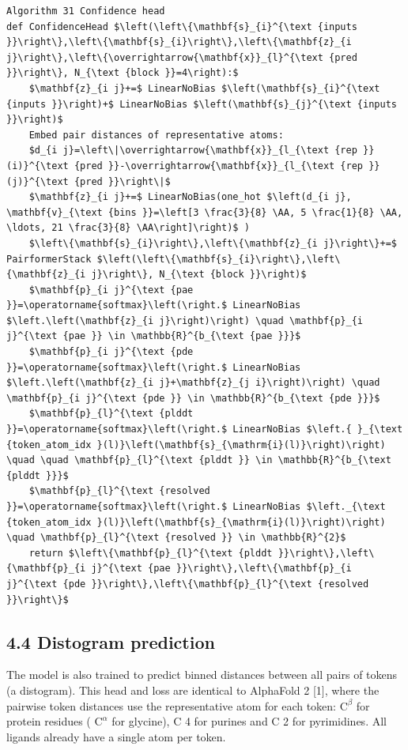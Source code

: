 \documentclass[10pt]{article}
\def\AA{\mathring{\mathrm{A}}}
\begin{document}
\begin{verbatim}
Algorithm 31 Confidence head
def ConfidenceHead $\left(\left\{\mathbf{s}_{i}^{\text {inputs }}\right\},\left\{\mathbf{s}_{i}\right\},\left\{\mathbf{z}_{i j}\right\},\left\{\overrightarrow{\mathbf{x}}_{l}^{\text {pred }}\right\}, N_{\text {block }}=4\right):$
    $\mathbf{z}_{i j}+=$ LinearNoBias $\left(\mathbf{s}_{i}^{\text {inputs }}\right)+$ LinearNoBias $\left(\mathbf{s}_{j}^{\text {inputs }}\right)$
    Embed pair distances of representative atoms:
    $d_{i j}=\left\|\overrightarrow{\mathbf{x}}_{l_{\text {rep }}(i)}^{\text {pred }}-\overrightarrow{\mathbf{x}}_{l_{\text {rep }}(j)}^{\text {pred }}\right\|$
    $\mathbf{z}_{i j}+=$ LinearNoBias(one_hot $\left(d_{i j}, \mathbf{v}_{\text {bins }}=\left[3 \frac{3}{8} \AA, 5 \frac{1}{8} \AA, \ldots, 21 \frac{3}{8} \AA\right]\right)$ )
    $\left\{\mathbf{s}_{i}\right\},\left\{\mathbf{z}_{i j}\right\}+=$ PairformerStack $\left(\left\{\mathbf{s}_{i}\right\},\left\{\mathbf{z}_{i j}\right\}, N_{\text {block }}\right)$
    $\mathbf{p}_{i j}^{\text {pae }}=\operatorname{softmax}\left(\right.$ LinearNoBias $\left.\left(\mathbf{z}_{i j}\right)\right) \quad \mathbf{p}_{i j}^{\text {pae }} \in \mathbb{R}^{b_{\text {pae }}}$
    $\mathbf{p}_{i j}^{\text {pde }}=\operatorname{softmax}\left(\right.$ LinearNoBias $\left.\left(\mathbf{z}_{i j}+\mathbf{z}_{j i}\right)\right) \quad \mathbf{p}_{i j}^{\text {pde }} \in \mathbb{R}^{b_{\text {pde }}}$
    $\mathbf{p}_{l}^{\text {plddt }}=\operatorname{softmax}\left(\right.$ LinearNoBias $\left.{ }_{\text {token_atom_idx }(l)}\left(\mathbf{s}_{\mathrm{i}(l)}\right)\right) \quad \quad \mathbf{p}_{l}^{\text {plddt }} \in \mathbb{R}^{b_{\text {plddt }}}$
    $\mathbf{p}_{l}^{\text {resolved }}=\operatorname{softmax}\left(\right.$ LinearNoBias $\left._{\text {token_atom_idx }(l)}\left(\mathbf{s}_{\mathrm{i}(l)}\right)\right) \quad \mathbf{p}_{l}^{\text {resolved }} \in \mathbb{R}^{2}$
    return $\left\{\mathbf{p}_{l}^{\text {plddt }}\right\},\left\{\mathbf{p}_{i j}^{\text {pae }}\right\},\left\{\mathbf{p}_{i j}^{\text {pde }}\right\},\left\{\mathbf{p}_{l}^{\text {resolved }}\right\}$
\end{verbatim}

\subsection*{4.4 Distogram prediction}
The model is also trained to predict binned distances between all pairs of tokens (a distogram). This head and loss are identical to AlphaFold 2 [1], where the pairwise token distances use the representative atom for each token: $\mathrm{C}^{\beta}$ for protein residues ( $\mathrm{C}^{\alpha}$ for glycine), C 4 for purines and C 2 for pyrimidines. All ligands already have a single atom per token.
\end{document}
